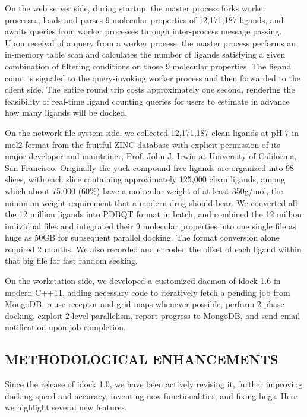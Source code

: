 \documentclass[12pt]{article}
\begin{document}
On the web server side, during startup, the master process forks worker processes, loads and parses 9 molecular properties of 12,171,187 ligands, and awaits queries from worker processes through inter-process message passing. Upon receival of a query from a worker process, the master process performs an in-memory table scan and calculates the number of ligands satisfying a given combination of filtering conditions on those 9 molecular properties. The ligand count is signaled to the query-invoking worker process and then forwarded to the client side. The entire round trip costs approximately one second, rendering the feasibility of real-time ligand counting queries for users to estimate in advance how many ligands will be docked.

On the network file system side, we collected 12,171,187 clean ligands at pH 7 in mol2 format from the fruitful ZINC database \citep{532,1178} with explicit permission of its major developer and maintainer, Prof. John J. Irwin at University of California, San Francisco. Originally the yuck-compound-free ligands are organized into 98 slices, with each slice containing approximately 125,000 clean ligands, among which about 75,000 (60\%) have a molecular weight of at least 350g/mol, the minimum weight requirement that a modern drug should bear. We converted all the 12 million ligands into PDBQT format in batch, and combined the 12 million individual files and integrated their 9 molecular properties into one single file as huge as 50GB for subsequent parallel docking. The format conversion alone required 2 months. We also recorded and encoded the offset of each ligand within that big file for fast random seeking.

On the workstation side, we developed a customized daemon of idock 1.6 in modern C++11, adding necessary code to iteratively fetch a pending job from MongoDB, reuse receptor and grid maps whenever possible, perform 2-phase docking, exploit 2-level parallelism, report progress to MongoDB, and send email notification upon job completion.

\subsection*{\sffamily \large METHODOLOGICAL ENHANCEMENTS}

Since the release of idock 1.0, we have been actively revising it, further improving docking speed and accuracy, inventing new functionalities, and fixing bugs. Here we highlight several new features.
\end{document}

